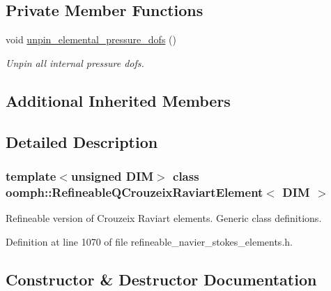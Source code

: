 \subsection*{Private Member Functions}
\begin{DoxyCompactItemize}
\item 
void \hyperlink{classoomph_1_1RefineableQCrouzeixRaviartElement_a4aa807058435a5efc4b1c28cefc4d080}{unpin\+\_\+elemental\+\_\+pressure\+\_\+dofs} ()
\begin{DoxyCompactList}\small\item\em Unpin all internal pressure dofs. \end{DoxyCompactList}\end{DoxyCompactItemize}
\subsection*{Additional Inherited Members}


\subsection{Detailed Description}
\subsubsection*{template$<$unsigned D\+IM$>$\newline
class oomph\+::\+Refineable\+Q\+Crouzeix\+Raviart\+Element$<$ D\+I\+M $>$}

Refineable version of Crouzeix Raviart elements. Generic class definitions. 

Definition at line 1070 of file refineable\+\_\+navier\+\_\+stokes\+\_\+elements.\+h.



\subsection{Constructor \& Destructor Documentation}
\mbox{\label{classoomph_1_1RefineableQCrouzeixRaviartElement_a7b1e2fdef2e0e606da26318ce4921e6f}} 
